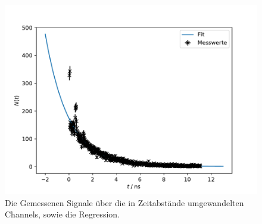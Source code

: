 \begin{figure}[h]
  \centering
  \includegraphics{myonen.pdf}
  \caption{Die Gemessenen Signale über die in Zeitabstände umgewandelten Channels, sowie die Regression.}
  \label{fig:myonen}
\end{figure}
